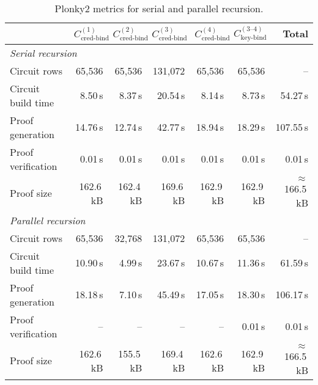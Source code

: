 \begin{table}[t]
	\centering
	\begin{tabular}{lrrrrrr}
		\toprule
		& \textbf{$C_{\text{cred-bind}}^{(1)}$} & \textbf{$C_{\text{cred-bind}}^{(2)}$} & \textbf{$C_{\text{cred-bind}}^{(3)}$} & \textbf{$C_{\text{cred-bind}}^{(4)}$} & \textbf{$C_{\text{key-bind}}^{(3\text{--}4)}$} & \textbf{Total} \\
		\midrule
		\multicolumn{7}{l}{\emph{Serial recursion}} \\
		Circuit rows        & 65{,}536  & 65{,}536  & 131{,}072 & 65{,}536  & 65{,}536  & -- \\
		Circuit build time  & 8.50\,s   & 8.37\,s   & 20.54\,s  & 8.14\,s   & 8.73\,s   & 54.27\,s \\
		Proof generation    & 14.76\,s  & 12.74\,s  & 42.77\,s  & 18.94\,s  & 18.29\,s  & 107.55\,s \\
		Proof verification  & 0.01\,s   & 0.01\,s   & 0.01\,s   & 0.01\,s   & 0.01\,s   & 0.01\,s \\
		Proof size          & 162.6\,kB & 162.4\,kB & 169.6\,kB & 162.9\,kB & 162.9\,kB & $\approx$166.5\,kB \\
		\midrule
		\multicolumn{7}{l}{\emph{Parallel recursion}} \\
		Circuit rows        & 65{,}536  & 32{,}768  & 131{,}072 & 65{,}536  & 65{,}536  & -- \\
		Circuit build time  & 10.90\,s  & 4.99\,s   & 23.67\,s  & 10.67\,s  & 11.36\,s  & 61.59\,s \\
		Proof generation    & 18.18\,s  & 7.10\,s   & 45.49\,s  & 17.05\,s  & 18.30\,s  & 106.17\,s \\
		Proof verification  & --        & --        & --        & --        & 0.01\,s   & 0.01\,s \\
		Proof size          & 162.6\,kB & 155.5\,kB & 169.4\,kB & 162.6\,kB & 162.9\,kB & $\approx$166.5\,kB \\
		\bottomrule
	\end{tabular}
	\caption{Plonky2 metrics for serial and parallel recursion.}
	\label{tab:plonky2-modular}
\end{table}
